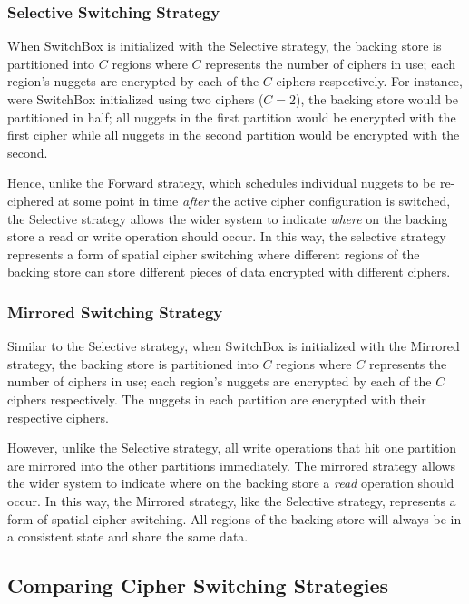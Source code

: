 \subsubsection{Selective Switching Strategy}

When SwitchBox is initialized with the Selective strategy, the backing store is
partitioned into $C$ regions where $C$ represents the number of ciphers in use;
each region's nuggets are encrypted by each of the $C$ ciphers respectively. For
instance, were SwitchBox initialized using two ciphers ($C = 2$), the backing
store would be partitioned in half; all nuggets in the first partition would be
encrypted with the first cipher while all nuggets in the second partition would
be encrypted with the second.

Hence, unlike the Forward strategy, which schedules individual nuggets to be
re-ciphered at some point in time \emph{after} the active cipher configuration
is switched, the Selective strategy allows the wider system to indicate
\emph{where} on the backing store a read or write operation should occur. In
this way, the selective strategy represents a form of spatial cipher switching
where different regions of the backing store can store different pieces of data
encrypted with different ciphers.

\subsubsection{Mirrored Switching Strategy}

Similar to the Selective strategy, when SwitchBox is initialized with the
Mirrored strategy, the backing store is partitioned into $C$ regions where $C$
represents the number of ciphers in use; each region's nuggets are encrypted by
each of the $C$ ciphers respectively. The nuggets in each partition are
encrypted with their respective ciphers.

However, unlike the Selective strategy, all write operations that hit one
partition are mirrored into the other partitions immediately. The mirrored
strategy allows the wider system to indicate where on the backing store a
\emph{read} operation should occur. In this way, the Mirrored strategy, like the
Selective strategy, represents a form of spatial cipher switching. All regions
of the backing store will always be in a consistent state and share the same
data.

\subsection{Comparing Cipher Switching Strategies}

